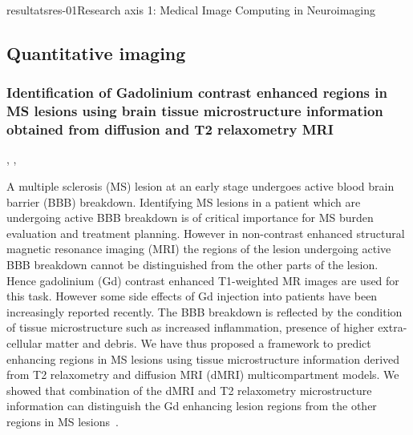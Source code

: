\documentclass{ra2018}
\begin{document}
\begin{module}{resultats}{res-01}{Research axis 1: Medical Image Computing in Neuroimaging}
\subsection{Quantitative imaging}
\subsubsection{Identification of Gadolinium contrast enhanced regions in MS lesions using brain tissue microstructure information obtained from diffusion and T2 relaxometry MRI}
\begin{participants}
      , 
      ,
\end{participants}
A multiple sclerosis (MS) lesion at an early stage undergoes active blood brain barrier (BBB) breakdown. Identifying MS lesions in a patient which are undergoing active BBB breakdown is of critical importance for MS burden evaluation and treatment planning. However in non-contrast enhanced structural magnetic resonance imaging (MRI) the regions of the lesion undergoing active BBB breakdown cannot be distinguished from the other parts of the lesion. Hence gadolinium (Gd) contrast enhanced T1-weighted MR images are used for this task. However some side effects of Gd injection into patients have been increasingly reported recently. The BBB breakdown is reflected by the condition of tissue microstructure such as increased inflammation, presence of higher extra-cellular matter and debris. We have thus proposed a framework to predict enhancing regions in MS lesions using tissue microstructure information derived from T2 relaxometry and diffusion MRI (dMRI) multicompartment models. We showed that combination of the dMRI and T2 relaxometry microstructure information can distinguish the Gd enhancing lesion regions from the other regions in MS lesions~\cite{chatterjee:hal-01830532}.


\end{module}
\end{document}
